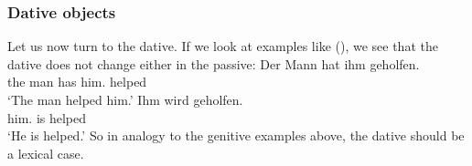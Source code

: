 \subsubsection{Dative objects}
\label{sec-dative-objects-tructurl-lexical}

Let us now turn to the dative. If we look at examples like (), we see that the dative does not
change either in the passive:
\eal
\ex 
\gll Der Mann hat ihm geholfen.\\
     the\NOM{} man  has him.\DAT{} helped\\
\glt `The man helped him.'
\ex 
\gll Ihm wird geholfen.\\
     him.\DAT{} is helped\\
\glt `He is helped.'
\zl
So in analogy to the genitive examples above, the dative should be a lexical case.

